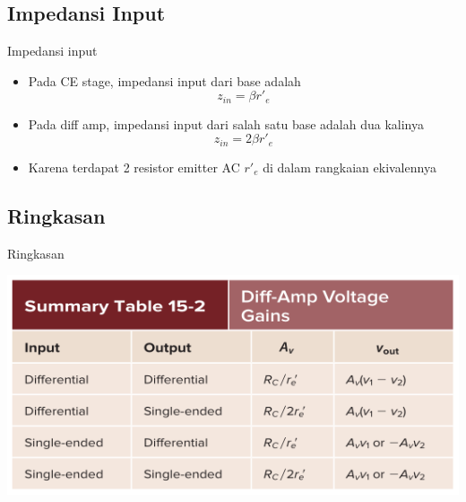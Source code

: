 \documentclass[aspectratio=169]{beamer}
\begin{document}
\subsection{Impedansi Input}
\begin{frame}{Impedansi input}
	\begin{itemize}
		\item Pada CE stage, impedansi input dari base adalah
		\[ z_{in} = \beta r'_e \]
		\item Pada diff amp, impedansi input dari salah satu base adalah dua kalinya
		\begin{equation}
			z_{in} = 2 \beta r'_e
		\end{equation}
		\item Karena terdapat 2 resistor emitter AC $ r'_e $ di dalam rangkaian ekivalennya
	\end{itemize}
\end{frame}

\subsection{Ringkasan}
\begin{frame}{Ringkasan}
	\begin{center}
		\includegraphics[height=0.7\textheight]{gambar/01.diff-amp/01.summary-diff-amp_voltage_gains}
	\end{center}
\end{frame}
\end{document}

